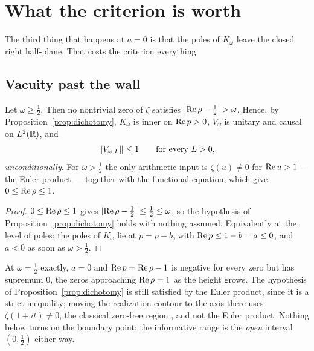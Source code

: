 \section{What the criterion is worth}\label{sec:criterion}

The third thing that happens at $a=0$ is that the poles of $K_\omega$ leave the
closed right half-plane. That costs the criterion everything.

\subsection{Vacuity past the wall}\label{sec:vacuity}

\begin{proposition}[Vacuity]\label{prop:vacuity}
Let $\omega\ge\frac12$. Then no nontrivial zero of $\zeta$ satisfies
$\lvert\operatorname{Re}\rho-\frac12\rvert>\omega$. Hence, by
Proposition~\ref{prop:dichotomy}, $K_\omega$ is inner on $\operatorname{Re} p>0$, $V_\omega$ is
unitary and causal on $L^2(\mathbb R)$, and
\begin{equation}\label{eq:vacuity}
 \lVert V_{\omega,L}\rVert\le1\qquad\text{for every }L>0,
\end{equation}
\emph{unconditionally}. For $\omega>\frac12$ the only arithmetic input is
$\zeta(u)\ne0$ for $\operatorname{Re} u>1$ --- the Euler product --- together with the
functional equation, which give $0\le\operatorname{Re}\rho\le1$.
\end{proposition}

\begin{proof}
$0\le\operatorname{Re}\rho\le1$ gives $\lvert\operatorname{Re}\rho-\frac12\rvert\le\frac12\le\omega$, so the
hypothesis of Proposition~\ref{prop:dichotomy} holds with nothing assumed.
Equivalently at the level of poles: the poles of $K_\omega$ lie at $p=\rho-b$,
with $\operatorname{Re} p\le1-b=a\le0$, and $a<0$ as soon as $\omega>\frac12$.
\end{proof}

\begin{remark}\label{rem:boundary}
At $\omega=\frac12$ exactly, $a=0$ and $\operatorname{Re} p=\operatorname{Re}\rho-1$ is negative for every
zero but has supremum $0$, the zeros approaching $\operatorname{Re}\rho=1$ as the height grows.
The hypothesis of Proposition~\ref{prop:dichotomy} is still satisfied by the
Euler product, since it is a strict inequality; moving the realization contour to
the axis there uses $\zeta(1+it)\ne0$, the classical zero-free region
\cite{Titchmarsh}, and not the Euler product. Nothing below turns on the boundary
point: the informative range is the \emph{open} interval $(0,\frac12)$ either
way.
\end{remark}

